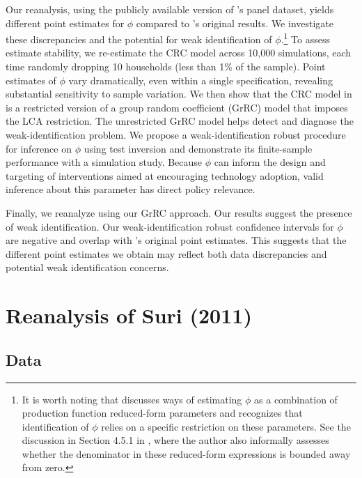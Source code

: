 \documentclass[12pt]{article}
\theoremstyle{plain}
\theoremstyle{definition}
\begin{document}
Our reanalysis, using the publicly available version of \citet{S2011}'s panel dataset, yields different point estimates for $\phi$ compared to \citet{S2011}'s original results.
We investigate these discrepancies and the potential for weak identification of $\phi$.\footnote{It is worth noting that \citet{S2011} discusses ways of estimating $\phi$ as a combination of production function reduced-form parameters and recognizes that identification of $\phi$ relies on a specific restriction on these parameters. See the discussion in Section 4.5.1 in \citet{S2011}, where the author also informally assesses whether the denominator in these reduced-form expressions is bounded away from zero.}
To assess estimate stability, we re-estimate the CRC model across 10,000 simulations, each time randomly dropping 10 households (less than 1\% of the sample).
Point estimates of $\phi$ vary dramatically, even within a single specification, revealing substantial sensitivity to sample variation.
We then show that the CRC model in \citet{S2011} is a restricted version of a group random coefficient (GrRC) model that imposes the LCA restriction. 
The unrestricted GrRC model helps detect and diagnose the weak-identification problem.
We propose a weak-identification robust procedure for inference on $\phi$ using test inversion and demonstrate its finite-sample performance with a simulation study.
Because $\phi$ can inform the design and targeting of interventions aimed at encouraging technology adoption, valid inference about this parameter has direct policy relevance.

Finally, we reanalyze \citet{S2011} using our GrRC approach. 
Our results suggest the presence of weak identification. 
Our weak-identification robust confidence intervals for $\phi$ are negative and overlap with \citet{S2011}'s original point estimates. 
This suggests that the different point estimates we obtain may reflect both data discrepancies and potential weak identification concerns.


\section{Reanalysis of Suri (2011)}\label{sec:suri}

\subsection{Data}
\end{document}
